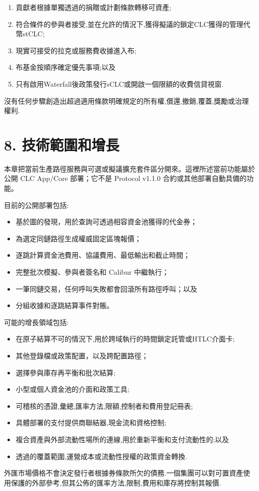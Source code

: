 \documentclass[11pt]{article}
\begin{document}
\begin{enumerate}[leftmargin=*]
\item 貢獻者根據單獨透過的捐贈或計劃條款轉移可資產;
\item 符合條件的參與者接受,並在允許的情況下,獲得擬議的鎖定CLC獲得的管理代幣stCLC;
\item 現實可接受的拉克或服務費收據進入布;
\item 布基金按順序確定優先事項;以及
\item 只有啟用Waterfall後政策發行sCLC或開啟一個限額的收費信貸視窗.
\end{enumerate}
沒有任何步驟創造出超過適用條款明確規定的所有權,償還,撤銷,覆蓋,獎勵或治理權利.


\section*{8. 技術範圍和增長}

本章把當前生產路徑服務與可選或擬議擴充套件區分開來。這裡所述當前功能屬於公開 CLC App/Core 部署；它不是 Protocol v1.1.0 合約或其他部署自動具備的功能。

目前的公開部署包括:

\begin{itemize}[leftmargin=*]
\item 基於圖的發現，用於查詢可透過相容資金池獲得的代金券；
\item 為選定同鏈路徑生成權威固定區塊報價；
\item 逐跳計算資金池費用、協議費用、最低輸出和截止時間；
\item 完整批次模擬、參與者簽名和 Calibur 中繼執行；
\item 一筆同鏈交易，任何呼叫失敗都會回滾所有路徑呼叫；以及
\item 分組收據和逐跳結算事件對賬。
\end{itemize}
可能的增長領域包括:

\begin{itemize}[leftmargin=*]
\item 在原子結算不可的情況下,用於跨域執行的時間鎖定託管或HTLC介面卡;
\item 其他登錄檔或政策配置，以及跨配置路徑；
\item 選擇參與庫存再平衡和批次結算;
\item 小型或個人資金池的介面和政策工具;
\item 可稽核的憑證,彙總,匯率方法,限額,控制者和費用登記冊表;
\item 具體部署的支付提供商聯結器,現金流和資格控制;
\item 複合資產與外部流動性場所的連線,用於重新平衡和支付流動性的;以及
\item 透過的覆蓋範圍,運營成本或流動性授權的政策資金轉換.
\end{itemize}
外匯市場價格不會決定發行者根據券條款所欠的債務.一個集團可以對可置資產使用保護的外部參考,但其公佈的匯率方法,限制,費用和庫存將控制其報價.
\end{document}
